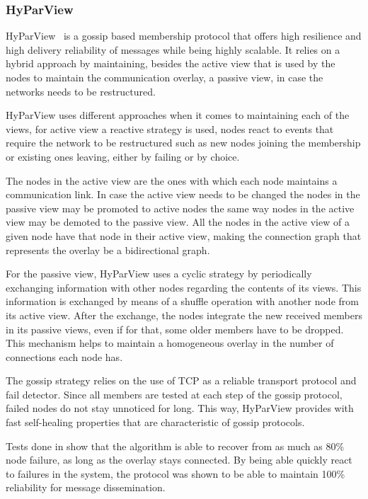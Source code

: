 \subsubsection{HyParView}\label{subsec:hyparview}

HyParView~\cite{hyparview} is a gossip based membership protocol that offers high
resilience and high delivery reliability of messages while being highly scalable.
It relies on a hybrid approach by maintaining, besides the active view that is 
used by the nodes to maintain the communication overlay, a passive view, in case
the networks needs to be restructured.

HyParView uses different approaches when it comes to maintaining each of the views,
for active view a reactive strategy is used, nodes react to events that require 
the network to be restructured such as new nodes joining the membership or
existing ones leaving, either by failing or by choice.

The nodes in the active view are the ones with which each node maintains a
communication link. In case the active view needs to be changed the nodes in
the passive view may be promoted to active nodes the same way nodes in the
active view may be demoted to the passive view. All the nodes in the active
view of a given node have that node in their active view, making the connection
graph that represents the overlay be a bidirectional graph.

For the passive view, HyParView uses a cyclic strategy by periodically exchanging
information with other nodes regarding the contents of its views. This information
is exchanged by means of a shuffle operation with another node from its active view.
After the exchange, the nodes integrate the new received members in its
passive views, even if for that, some older members have to be dropped. This
mechanism helps to maintain a homogeneous overlay in the number of connections
each node has.

The gossip strategy relies on the use of TCP as a reliable transport protocol and fail
detector. Since all members are tested at each step of the gossip protocol, failed nodes
do not stay unnoticed for long. This way, HyParView provides with fast self-healing
properties that are characteristic of gossip protocols.

Tests done in \cite{hyparview} show that the algorithm is able to recover from as much as 80\%
node failure, as long as the overlay stays connected. By being able quickly react to failures
in the system, the protocol was shown to be able to maintain 100\% reliability 
for message dissemination.


